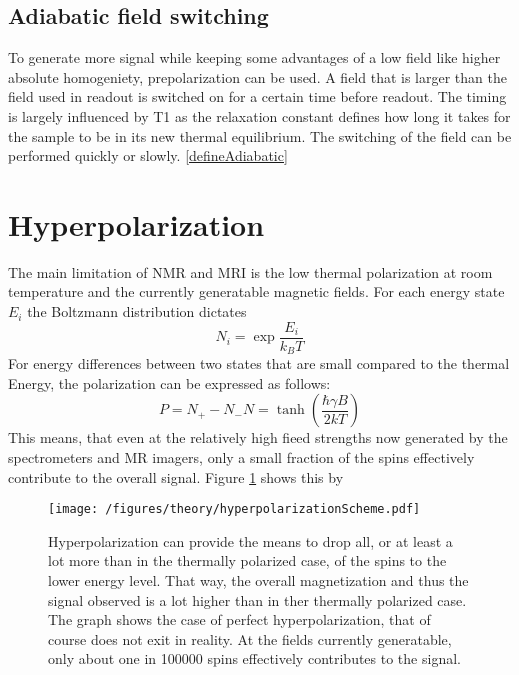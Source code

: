         \subsection{Adiabatic field switching}
            To generate more signal while keeping some advantages of a low field like higher absolute homogeniety, prepolarization can be used. A field that is larger than the field used in readout is switched on for a certain time before readout. The timing is largely influenced by T1 as the relaxation constant defines how long it takes for the sample to be in its new thermal equilibrium. The switching of the field can be performed quickly or slowly. \ref{defineAdiabatic}
    \section{Hyperpolarization}
    The main limitation of NMR and MRI is the low thermal polarization at room temperature and the currently generatable magnetic fields. For each energy state $E_i$ the Boltzmann distribution dictates
        \begin{equation}
            N_i = \exp{\frac{E_i}{k_B T}}
        \end{equation}
        For energy differences between two states that are small compared to the thermal Energy, the polarization can be expressed as follows:
        \begin{equation}
            P = {N_+-N_-}{N} = \tanh\left(\frac{\hbar \gamma B}{2 k T }\right)
            \label{equation:theory:polarization}
        \end{equation}
        This means, that even at the relatively high fieed strengths now generated by the spectrometers and MR imagers, only a small fraction of the spins effectively contribute to the overall signal. Figure \ref{} shows this by 
        \begin{figure}
            \centering
            \texttt{[image: /figures/theory/hyperpolarizationScheme.pdf]}
            \caption[Hyperpolarization scheme]{Hyperpolarization can provide the means to drop all, or at least a lot more than in the thermally polarized case, of the spins to the lower energy level. That way, the overall magnetization and thus the signal observed is a lot higher than in ther thermally polarized case. The graph shows the case of perfect hyperpolarization, that of course does not exit in reality. At the fields currently generatable, only about one in 100000 spins effectively contributes to the signal.}
        \end{figure}
